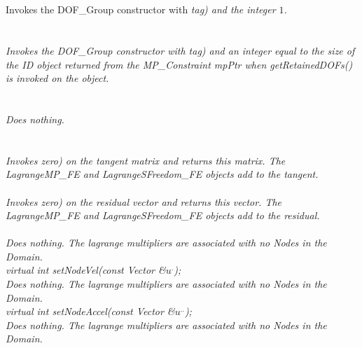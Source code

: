   \\
  \\
Invokes the DOF\_Group constructor with {\em tag) and the integer $1$. \\

  \\ \\
Invokes the DOF\_Group constructor with {\em tag) and an integer equal
to the size of the ID object returned from the MP\_Constraint {\em
mpPtr} when getRetainedDOFs() is invoked on the object. \\

  \\
  \\
Does nothing. \\

 \\
 \\
Invokes {\em zero{}) on the tangent matrix and returns this matrix. 
The LagrangeMP\_FE and LagrangeSFreedom\_FE objects add to the tangent. \\


\\
Invokes {\em zero{}) on the residual vector and returns this vector. 
The LagrangeMP\_FE and LagrangeSFreedom\_FE objects add to the residual. \\

 \\
Does nothing. The lagrange multipliers are associated with no Nodes
in the Domain. \\


{\em virtual int setNodeVel(const Vector \&$u^{.}$);}\\
Does nothing. The lagrange multipliers are associated with no Nodes
in the Domain. \\

{\em virtual int setNodeAccel(const Vector \&$u^{..}$);}\\
Does nothing. The lagrange multipliers are associated with no Nodes
in the Domain. \\

}}}}

